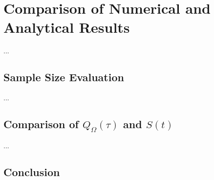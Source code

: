 \section{Comparison of Numerical and Analytical Results}

...

\subsection{Sample Size Evaluation}


...


\subsection{Comparison of $Q_{\Omega}(\tau)$ and $S(t)$}


...


\subsection{Conclusion}

